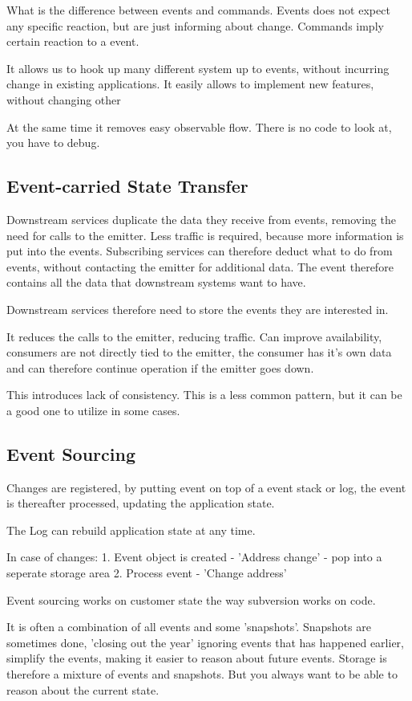 What is the difference between events and commands. Events does not expect any specific reaction, but are just informing about change. Commands imply certain reaction to a event.

It allows us to hook up many different system up to events, without incurring change in existing applications. It easily allows to implement new features, without changing other

At the same time it removes easy observable flow. There is no code to look at, you have to debug.

\subsection{Event-carried State Transfer}
Downstream services duplicate the data they receive from events, removing the need for calls to the emitter. Less traffic is required, because more information is put into the events. Subscribing services can therefore deduct what to do from events, without contacting the emitter for additional data. The event therefore contains all the data that downstream systems want to have.

Downstream services therefore need to store the events they are interested in. 

It reduces the calls to the emitter, reducing traffic. Can improve availability, consumers are not directly tied to the emitter, the consumer has it's own data and can therefore continue operation if the emitter goes down.

This introduces lack of consistency. This is a less common pattern, but it can be a good one to utilize in some cases.

\subsection{Event Sourcing}
Changes are registered, by putting event on top of a event stack or log, the event is thereafter processed, updating the application state.

The Log can rebuild application state at any time.

In case of changes:
1. Event object is created - 'Address change' - pop into a seperate storage area
2. Process event - 'Change address'

Event sourcing works on customer state the way subversion works on code.

It is often a combination of all events and some 'snapshots'. Snapshots are sometimes done, 'closing out the year' ignoring events that has happened earlier, simplify the events, making it easier to reason about future events. Storage is therefore a mixture of events and snapshots. But you always want to be able to reason about the current state.

